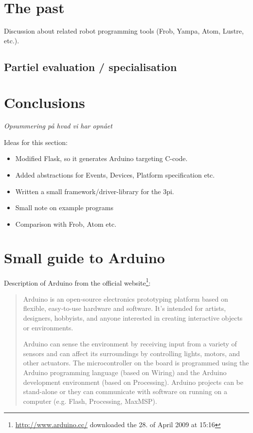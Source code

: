\documentclass[a4paper, oneside, final]{memoir}
\begin{document}
\chapter{The past}
Discussion about related robot programming tools (Frob, Yampa, Atom,
Lustre, etc.).

\section{Partiel evaluation / specialisation} 

\chapter{Conclusions}
\textit{Opsummering på hvad vi har opnået}

Ideas for this section:
\begin{itemize}
\item Modified Flask, so it generates Arduino targeting C-code.
\item Added abstractions for Events, Devices, Platform specification etc.
\item Written a small framework/driver-library for the 3pi.
\item Small note on example programs
\item Comparison with Frob, Atom etc.
\end{itemize}





\appendix

\chapter{Small guide to Arduino}


Description of Arduino from the official
website\footnote{\url{http://www.arduino.cc/} downloaded the 28. of April 2009 at 15:16}:
\begin{quotation}
  Arduino is an open-source electronics prototyping platform based on
  flexible, easy-to-use hardware and software. It's intended for
  artists, designers, hobbyists, and anyone interested in creating
  interactive objects or environments.

  Arduino can sense the environment by receiving input from a variety
  of sensors and can affect its surroundings by controlling lights,
  motors, and other actuators. The microcontroller on the board is
  programmed using the Arduino programming language (based on Wiring)
  and the Arduino development environment (based on
  Processing). Arduino projects can be stand-alone or they can
  communicate with software on running on a computer (e.g. Flash,
  Processing, MaxMSP).
\end{quotation}
\end{document}
